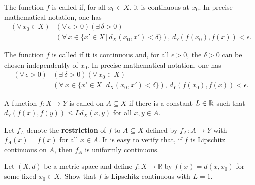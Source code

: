 \begin{definition}
The function $f$ is called  if, for all $x_0 \in X$, it is continuous at $x_0$.
In precise mathematical notation, one has
\begin{equation*}
\begin{split}
(\forall \, x_0 \in X) & (\forall \, \epsilon >0) ( \exists \, \delta >0) \\ & (\forall \, x \in \{x'\in X\,|\,d_X (x_0,x')<\delta\}), \,
  d_Y \left( f(x_0),f(x) \right) < \epsilon .
\end{split}
\end{equation*}
\end{definition}

\begin{definition}
The function $f$ is called  if it is continuous and, for all $\epsilon > 0$, the $\delta >0$ can be chosen independently of $x_0$.
In precise mathematical notation, one has
\begin{equation*}
\begin{split}
(\forall \, \epsilon >0)  & ( \exists \, \delta >0) (\forall \, x_0 \in X) \\ & (\forall \, x \in \{x'\in X\,|\,d_X (x_0,x')<\delta\}), \,
  d_Y \left( f(x_0),f(x) \right) < \epsilon .
\end{split}
\end{equation*}
\end{definition}

\begin{definition}
A function $f  \colon X \rightarrow Y$ is called  on $A \subseteq X$ if there is a constant $L \in \mathbb{R}$ such that $d_Y (f(x),f(y)) \leq L d_X (x,y)$ for all $x,y\in A$.
\end{definition}

Let $f_A$ denote the \textbf{restriction} of $f$ to $A\subseteq X$ defined by $f_A \colon A \to Y$ with $f_A (x) = f(x)$ for all $x\in A$.
It is easy to verify that, if $f$ is Lipschitz continuous on $A$, then $f_A$ is uniformly continuous.

\begin{problem}
Let $(X,d)$ be a metric space and define $f: X \to \mathbb{R}$ by $f(x)=d(x,x_0)$ for some fixed $x_0 \in X$.
Show that $f$ is Lipschitz continuous with $L=1$.
\end{problem}


